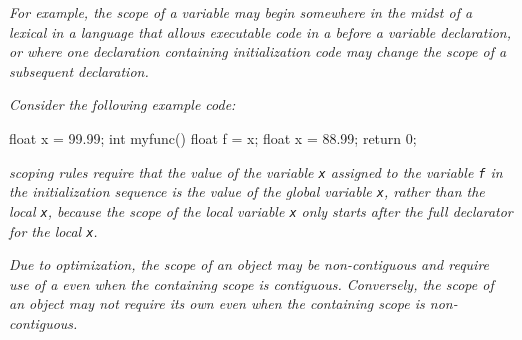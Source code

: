 \textit{For example, the scope of a variable may begin somewhere
in the midst of a lexical  in a
language that allows executable code in a
 before a variable declaration, or where one declaration
containing initialization code may change the scope of a
subsequent declaration.}

\textit{Consider the following example  code:}
\par %
\begin{nlnlisting}
float x = 99.99;
int myfunc()
{
    float f = x;
    float x = 88.99;
    return 0;
}
\end{nlnlisting}

\textit{ scoping rules require that the value of the
variable \texttt{x} assigned to the variable \texttt{f} in the
initialization sequence is the value of the global variable \texttt{x},
rather than the local \texttt{x}, because the scope of the local variable
\texttt{x} only starts after the full declarator for the local \texttt{x}.}

\textit{Due to optimization, the scope of an object may be
non-contiguous and require use of a  even when
the containing scope is contiguous. Conversely, the scope of
an object may not require its own  even when the
containing scope is non-contiguous.}

